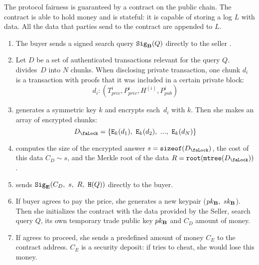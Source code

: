 The protocol fairness is guaranteed by a contract on the public chain. The contract is able to hold money and is stateful: it is capable of storing a log $L$ with data. All the data that parties send to the contract are appended to $L$.
\begin{enumerate}
\item The buyer  sends a signed search query $\mathtt{Sig}_{\mathbf{B}}(Q)$ directly to the seller .
\item Let $D$ be a set of authenticated transactions relevant for the query $Q$.  divides~$D$ into $N$ chunks. When disclosing private transaction, one chunk $d_i$ is a transaction with proofs that it was included in a certain private block:
\begin{equation}
d_i: (T_{priv}^i, P_{priv}^i, H^{(i)}, P_{pub}^i)
\end{equation}

\item {} generates a symmetric key $k$ and encrypts each~$d_i$ with $k$. Then she makes an array of encrypted chunks:
\begin{equation}
\Lock{D} = \{ \Encrypt_\Key{k}(d_1),\ \Encrypt_\Key{k}(d_2),\ ...,\ \Encrypt_\Key{k}(d_N) \}
\end{equation}

\item {} computes the size of the encrypted answer $s = \SizeOf(\Lock{D})$, the cost of this data $C_D \sim s$, and the Merkle root of the data $R = \Root(\MerkleTree(\Lock{D}))$.

\item {} sends $\Sign_\Party{E}(C_D,\ s,\ R,\ \Hash(Q))$ directly to the buyer.

\item If buyer agrees to pay the price, she generates a new keypair ($pk_{\mathbf{B}},\ sk_{\mathbf{B}}$). Then she initializes the contract with the data provided by the Seller, search query $Q$, its own temporary trade public key $pk_{\mathbf{B}}$ and $C_D$ amount of money.

\item \label{step:seller-deposits-money} If  agrees to proceed, she sends a predefined amount of money $C_E$ to the contract address. $C_E$ is a security deposit: if  tries to cheat, she would lose this money.


\end{enumerate}

